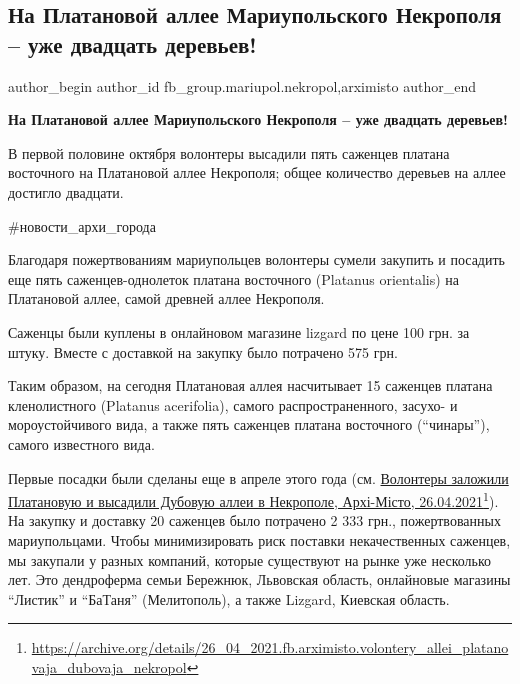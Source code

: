  
 
 
 
 

\subsection{На Платановой аллее Мариупольского Некрополя – уже двадцать деревьев!}
\label{sec:22_10_2021.fb.fb_group.mariupol.nekropol.1.platanovaja_alleja_nekropol_dvadcat_derevjev}
 
\ifcmt
 author_begin
   author_id fb_group.mariupol.nekropol,arximisto
 author_end
\fi

\vspace{0.5cm}
\textbf{На Платановой аллее Мариупольского Некрополя – уже двадцать деревьев!}

В первой половине октября волонтеры высадили пять саженцев платана восточного
на Платановой аллее Некрополя; общее количество деревьев на аллее достигло
двадцати.

\#новости\_архи\_города

Благодаря пожертвованиям мариупольцев волонтеры сумели закупить и посадить еще
пять саженцев-однолеток платана восточного (Platanus orientalis) на Платановой
аллее, самой древней аллее Некрополя.

Саженцы были куплены в онлайновом магазине lizgard по цене 100 грн. за штуку.
Вместе с доставкой на закупку было потрачено 575 грн.

Таким образом, на сегодня Платановая аллея насчитывает 15 саженцев платана
кленолистного (Platanus acerifolia), самого распространенного, засухо- и
мороустойчивого вида, а также пять саженцев платана восточного
(\enquote{чинары}), самого известного вида.

Первые посадки были сделаны еще в апреле этого года (см.
\href{https://archive.org/details/26_04_2021.fb.arximisto.volontery_allei_platanovaja_dubovaja_nekropol}{Волонтеры
заложили Платановую и высадили Дубовую аллеи в Некрополе, Архі-Місто,
26.04.2021}\footnote{\url{https://archive.org/details/26_04_2021.fb.arximisto.volontery_allei_platanovaja_dubovaja_nekropol}}).
На закупку и доставку 20 саженцев было потрачено 2 333 грн., пожертвованных
мариупольцами. Чтобы минимизировать риск поставки некачественных саженцев, мы
закупали у разных компаний, которые существуют на рынке уже несколько лет. Это
дендроферма семьи Бережнюк, Львовская область, онлайновые магазины
\enquote{Листик} и \enquote{БаТаня} (Мелитополь), а также Lizgard, Киевская
область.

